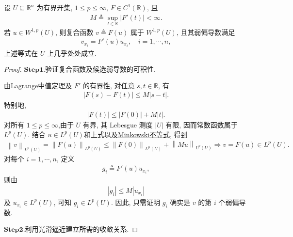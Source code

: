 \documentclass[../../main.tex]{subfiles}
\begin{document}
\begin{proposition}[弱导数链式法则]\label{proposition:弱导数链式法则}
设 $U\subseteq\mathbb{R}^{n}$ 为有界开集, $1\leqslant p\leqslant\infty$, $F\in C^{1}(\mathbb{R})$, 且
\begin{align*}
M\triangleq\sup\limits_{t\in\mathbb{R}}|F'(t)|<\infty.
\end{align*}
若 $u\in W^{1,p}(U)$, 则复合函数 $v\triangleq F(u)$ 属于 $W^{1,p}(U)$, 且其弱偏导数满足
\begin{align*}
v_{x_i}=F'(u)u_{x_i},\quad i=1,\cdots,n,
\end{align*}
上述等式在 $U$ 上几乎处处成立.
\end{proposition}
\begin{proof}
\noindent$\mathbf{Step}\bm{1}.${\heiti 验证复合函数及候选弱导数的可积性.}

由Lagrange中值定理及 $F'$ 的有界性, 对任意 $s,t\in\mathbb{R}$, 有
\begin{align}\label{eqJIOJFIOIWIOURIOWORWPPPPPnksksjsjsiohhssijsijsiixxx}
|F(s)-F(t)|\leqslant M|s-t|.
\end{align}
特别地,
\begin{align*}
|F(t)|\leqslant |F(0)|+M|t|.
\end{align*}
对所有 $1\leqslant p\leqslant\infty$,由于 $U$ 有界, 其 Lebesgue 测度 $|U|$ 有限, 因而常数函数属于 $L^{p}(U)$. 结合 $u\in L^{p}(U)$和上式以及\hyperref[Real Analysis-theorem:实变函数--Minkowski不等式]{Minkowski不等式}, 得到
\begin{align*}
\left\| v \right\| _{L^p\left( U \right)}=\left\| F\left( u \right) \right\| _{L^p\left( U \right)}\leqslant \left\| F\left( 0 \right) \right\| _{L^p\left( U \right)}+\left\| Mu \right\| _{L^p\left( U \right)}\Longrightarrow v=F\left( u \right) \in L^p\left( U \right) .
\end{align*}
对每个 $i=1,\cdots,n$, 定义
\begin{align*}
g_i\triangleq F'(u)u_{x_i},
\end{align*}
则由
\begin{align*}
|g_i|\leqslant M|u_{x_i}|
\end{align*}
及 $u_{x_i}\in L^{p}(U)$, 可知 $g_i\in L^{p}(U)$. 因此, 只需证明 $g_i$ 确实是 $v$ 的第 $i$ 个弱偏导数.

\noindent$\mathbf{Step}\bm{2}.${\heiti 利用光滑逼近建立所需的收敛关系.}


\end{proof}
\end{document}
